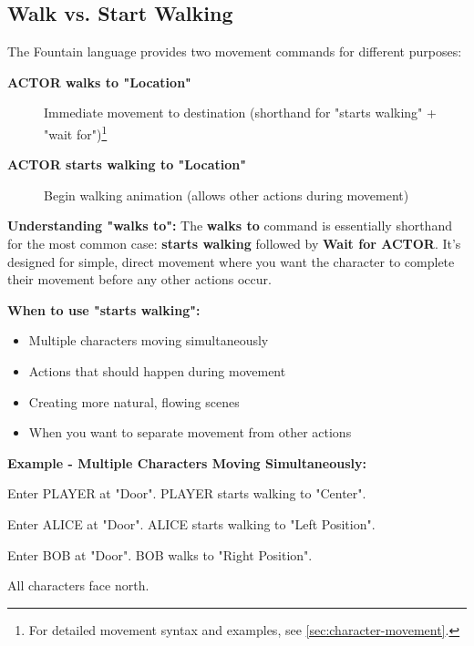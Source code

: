 \documentclass[11pt,letterpaper,oldstylefigures]{memoir}
\newcommand{\stagedir}[1]{#1\par\vspace{1\baselineskip}}
\newenvironment{FountainExample}
  {\begingroup
  \ttfamily\small
   \setlength{\parindent}{0pt}
  \setlength{\parskip}{0.5em}
  \allowdisplaybreaks
  \setlength{\displaywidowpenalty}{0}
  \setlength{\widowpenalty}{0}
  \setlength{\clubpenalty}{0}
  \setlength{\interlinepenalty}{0}
}
  {\endgroup}
\newcommand{\fountain}[1]{\textbf{#1}}
\begin{document}
\subsection{Walk vs. Start Walking}

The Fountain language provides two movement commands for different purposes:

\begin{description}
\item[\fountain{ACTOR walks to "Location"}] Immediate movement to destination (shorthand for "starts walking" + "wait for")\footnote{For detailed movement syntax and examples, see \autoref{sec:character-movement}.}
\item[\fountain{ACTOR starts walking to "Location"}] Begin walking animation (allows other actions during movement)
\end{description}

\textbf{Understanding "walks to":}
The \fountain{walks to} command is essentially shorthand for the most common case: \fountain{starts walking} followed by \fountain{Wait for ACTOR}. It's designed for simple, direct movement where you want the character to complete their movement before any other actions occur.

\textbf{When to use "starts walking":}
\begin{itemize}
\item Multiple characters moving simultaneously
\item Actions that should happen during movement
\item Creating more natural, flowing scenes
\item When you want to separate movement from other actions
\end{itemize}

\textbf{Example - Multiple Characters Moving Simultaneously:}
\begin{FountainExample}
\stagedir{Enter PLAYER at "Door". PLAYER starts walking to "Center".}
\stagedir{Enter ALICE at "Door". ALICE starts walking to "Left Position".}
\stagedir{Enter BOB at "Door". BOB walks to "Right Position".}
\stagedir{All characters face north.}
\end{FountainExample}
\end{document}

